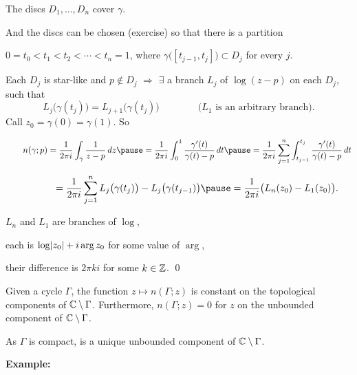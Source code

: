 \documentclass[10pt,aspectratio=169]{beamer}
\begin{document}
\begin{frame}
The discs $D_1,\ldots,D_n$ cover $\gamma$.

\medskip
\pause

And the discs can be chosen (exercise) so that
there is a partition

$0 = t_0 < t_1 < t_2 < \cdots < t_n = 1$, where
$\gamma\bigl([t_{j-1},t_j]\bigr) \subset D_j$ for every $j$.

\medskip
\pause

Each $D_j$ is star-like and $p \notin D_j$ \quad $\Rightarrow$ \quad
$\exists$ a branch $L_j$ 
of $\log (z-p)$ on each $D_j$, such that
\[
L_j\bigl(\gamma(t_j)\bigr) = L_{j+1}\bigl(\gamma(t_j)\bigr)
\qquad\qquad
\text{($L_1$ is an arbitrary branch).}
\]
\pause
Call $z_0 = \gamma(0) = \gamma(1)$. \pause
So

\medskip
$\displaystyle
\qquad n(\gamma;p)
=
\frac{1}{2\pi i} \int_\gamma \frac{1}{z-p} \, dz
\pause
=
\frac{1}{2\pi i} \int_0^1 \frac{\gamma'(t)}{\gamma(t)-p} \, dt
\pause
=
\frac{1}{2\pi i} \sum_{j=1}^n \int_{t_{j-1}}^{t_j} \frac{\gamma'(t)}{\gamma(t)-p} \, dt
$
\pause

$\displaystyle
\phantom{\qquad n(\gamma;p)}
=
\frac{1}{2\pi i} \sum_{j=1}^n L_j\bigl(\gamma(t_j)\bigr) -
L_j\bigl(\gamma(t_{j-1})\bigr)
\pause
=
\frac{1}{2\pi i} \bigl( L_n(z_0) - L_1(z_0) \bigr) .
$

\medskip
\pause

$L_n$ and $L_1$ are branches of $\log$,

\pause
each is $\log\lvert {z_0} \rvert + i \arg z_0$ for some value of $\arg$,

\pause
their difference is $2\pi k i$ for some $k \in {\mathbb{Z}}$.
\qed
\end{frame}

\begin{frame}
\begin{proposition}
Given a cycle $\Gamma$,
the function $z \mapsto n(\Gamma;z)$ is constant on the
topological components of ${\mathbb{C}} \setminus \Gamma$.
\pause
Furthermore, $n(\Gamma;z) = 0$ for $z$ on the unbounded component
of ${\mathbb{C}} \setminus \Gamma$.
\end{proposition}

\pause

As $\Gamma$ is compact, is a unique unbounded component
of ${\mathbb{C}} \setminus \Gamma$.

\medskip
\pause

\textbf{Example:}

\begin{center}
\end{center}
\end{frame}
\end{document}
